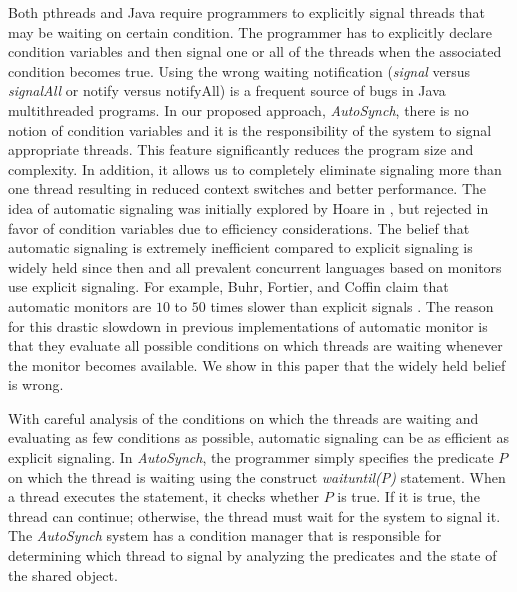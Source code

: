 \documentclass{sigplanconf}
\begin{document}
Both pthreads and Java require programmers to explicitly
signal threads that may be waiting on certain condition. The programmer
has to explicitly declare condition variables and then signal one
or all of the threads when the associated condition becomes true.
Using the wrong waiting notification ({\em signal} versus {\em signalAll} or notify
versus notifyAll) is a frequent source of bugs in Java multithreaded
programs. In our proposed approach, {\em AutoSynch}, there is no notion of condition variables
and it is the responsibility of the system to signal appropriate threads.
This feature significantly reduces the program size and complexity.
In addition, it allows us to completely eliminate signaling more than 
one thread resulting in reduced context switches and better performance.
The idea of automatic signaling was initially explored by Hoare in \cite{hoa74},
but rejected in favor of condition variables due to efficiency considerations.
The belief that automatic signaling is extremely inefficient compared to
explicit signaling is widely held since then and
all prevalent concurrent languages based on monitors use
explicit signaling.
For example, Buhr, Fortier, and Coffin claim that automatic monitors are $10$ to $50$ times
slower than explicit signals \cite{bfc95}. The reason for this drastic slowdown in 
previous implementations of automatic monitor  is that they evaluate
all possible conditions on which threads are waiting whenever the monitor
becomes available. We show in this
paper that the widely held belief is wrong.

 With careful analysis of the conditions on which
the threads are waiting and evaluating as few conditions as possible, automatic signaling can be as efficient 
as explicit signaling.
In {\em AutoSynch}, the programmer simply specifies the predicate $P$ on which the thread is 
waiting using the construct {\em waituntil(P)} statement. 
When a thread executes the statement, it checks whether $P$ is true. If it is true, the thread can continue; 
otherwise, the thread must wait for the system to signal it. The {\em
AutoSynch} system has a condition manager that is responsible for determining
which thread to signal by analyzing the predicates and the state of the shared object. 
\end{document}
